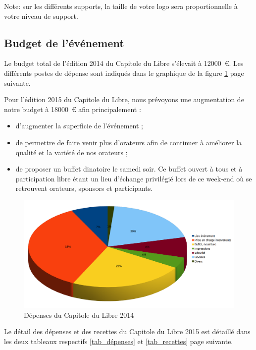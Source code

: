 Note: sur les différents supports, la taille de votre logo sera proportionnelle à votre niveau de support.

	\subsection{Budget de l’événement}

Le budget total de l'édition 2014 du Capitole du Libre s'élevait à \SI{12000}{\euro}. Les différents postes de dépense sont indiqués dans le graphique de la figure \ref{fig_budget} page suivante.

Pour l'édition 2015 du Capitole du Libre, nous prévoyons une augmentation de notre budget à \SI{18000}{€} afin principalement :
\begin{itemize}[label=$\bullet$]
\item d'augmenter la superficie de l'événement ;
\item de permettre de faire venir plus d'orateurs afin de continuer à améliorer la qualité et la variété de nos orateurs ;
\item de proposer un buffet dinatoire le samedi soir. Ce buffet ouvert à tous et à participation libre étant un lieu d'échange privilégié lors de ce week-end où se retrouvent orateurs, sponsors et participants.
\end{itemize}

\begin{figure}
\includegraphics[width=\textwidth]{Images/budget_2014-2.png}
\caption{Dépenses du Capitole du Libre 2014}\label{fig_budget}
\end{figure}

\Separateur

Le détail des dépenses et des recettes du Capitole du Libre 2015 est détaillé dans les deux tableaux respectifs \ref{tab_dépenses} et \ref{tab_recettes} page suivante.

